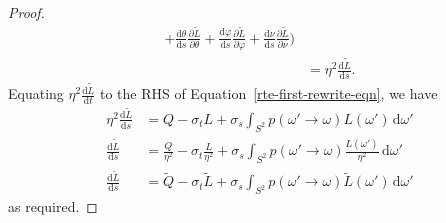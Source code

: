 \documentclass[10pt]{article}
\newcommand{\dee}{\mathrm{d}}
\newcommand{\ra}{\rightarrow}
\begin{document}
\begin{itemize}
\begin{proof}
\begin{align*}
        + \frac{\dee \theta}{\dee s} \frac{\partial \tilde L}{\partial \theta}
        + \frac{\dee \varphi}{\dee s} \frac{\partial \tilde L}{\partial \varphi}
        + \frac{\dee \nu}{\dee s} \frac{\partial \tilde L}{\partial \nu}
        \bigg) \\
        &= \eta^2 \frac{\dee \tilde L}{\dee s}.
      \end{align*}
      Equating $\eta^2 \frac{\dee \tilde L}{\dee t}$ to the RHS of Equation~\ref{rte-first-rewrite-eqn}, we have
      \begin{align*}
        \eta^2 \frac{\dee \tilde L}{\dee s}
        &= Q -\sigma_t L + \sigma_s \int_{S^2} p(\omega' \ra \omega) L(\omega')\, \dee \omega'\\
        \frac{\dee \tilde L}{\dee s}
        &= \frac{Q}{\eta^2} -\sigma_t \frac{L}{\eta^2} + \sigma_s \int_{S^2} p(\omega' \ra \omega) \frac{L(\omega')}{\eta^2}\, \dee \omega'\\
        \frac{\dee \tilde L}{\dee s}
        &= \tilde Q -\sigma_t \tilde L + \sigma_s \int_{S^2} p(\omega' \ra \omega) \tilde L(\omega')\, \dee \omega'
      \end{align*}
      as required.
    \end{proof}    
  \end{itemize}
\end{document}
